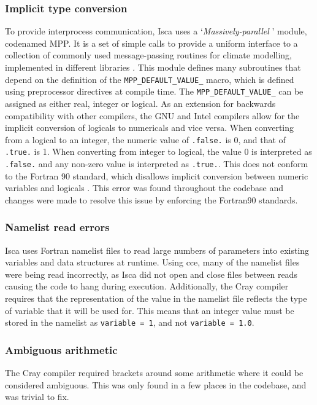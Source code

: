 \documentclass[a4paper,11pt]{report}
\begin{document}
\subsubsection{Implicit type conversion}
To provide interprocess communication, Isca uses a `\textit{Massively-parallel} ' module, codenamed MPP. It is a set of simple calls to provide a uniform interface to a collection of commonly used message-passing routines for climate modelling, implemented in different libraries \cite{balaji2002fms}. This module defines many subroutines that depend on the definition of the \texttt{MPP\_DEFAULT\_VALUE\_} macro, which is defined using preprocessor directives at compile time. The \texttt{MPP\_DEFAULT\_VALUE\_} can be assigned as either real, integer or logical. As an extension for backwards compatibility with other compilers, the GNU and Intel compilers allow for the implicit conversion of logicals to numericals and vice versa. When converting from a logical to an integer, the numeric value of \texttt{.false.} is 0, and that of \texttt{.true.} is 1. When converting from integer to logical, the value 0 is interpreted as \texttt{.false.} and any non-zero value is interpreted as \texttt{.true.}. This does not conform to the Fortran 90 standard, which disallows implicit conversion between numeric variables and logicals \cite{fortran1991standard,gnu2019conversion}. This error was found throughout the codebase and changes were made to resolve this issue by enforcing the Fortran90 standards.

\subsubsection{Namelist read errors}
Isca uses Fortran namelist files to read large numbers of parameters into existing variables and data structures at runtime. Using \gls{cce}, many of the namelist files were being read incorrectly, as Isca did not open and close files between reads causing the code to hang during execution. Additionally, the Cray compiler requires that the representation of the value in the namelist file reflects the type of variable that it will be used for. This means that an integer value must be stored in the namelist as \texttt{variable = 1}, and not \texttt{variable = 1.0}.

\subsubsection{Ambiguous arithmetic}
The Cray compiler required brackets around some arithmetic where it could be considered ambiguous. This was only found in a few places in the codebase, and was trivial to fix. 
\end{document}
